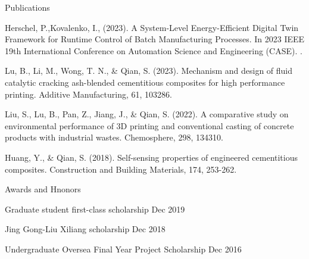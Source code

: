 \documentclass{resume}
\begin{document}
\begin{rSection}{Publications}
\vspace{-10pt}
\item {\color{blue}{Li, H.,}} Herschel, P.,Kovalenko, I., (2023). A System-Level Energy-Efficient Digital Twin Framework for Runtime Control of Batch Manufacturing Processes. In 2023 IEEE 19th International Conference on Automation Science and Engineering (CASE). {\color{blue}{Accepted}}.
\item Lu, B., {\color{blue}{Li, H.,}} Li, M., Wong, T. N., \& Qian, S. (2023). Mechanism and design of fluid catalytic cracking ash-blended cementitious composites for high performance printing. Additive Manufacturing, 61, 103286.
\item Liu, S., Lu, B., {\color{blue}{Li, H.,}} Pan, Z., Jiang, J., \& Qian, S. (2022). A comparative study on environmental performance of 3D printing and conventional casting of concrete products with industrial wastes. Chemosphere, 298, 134310.
\item Huang, Y., {\color{blue}{Li, H.,}} \& Qian, S. (2018). Self-sensing properties of engineered cementitious composites. Construction and Building Materials, 174, 253-262.
\end{rSection}

\begin{rSection}{Awards and Hnonors}
\vspace{-10pt}
\item {Graduate student first-class scholarship} \hfill{Dec 2019}
\item {Jing Gong-Liu Xiliang scholarship} \hfill{Dec 2018}
\item {Undergraduate Oversea Final Year Project Scholarship} \hfill{Dec 2016}
\end{rSection}


\end{document}
